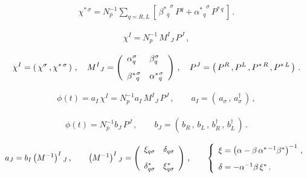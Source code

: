 \begin{eqnarray}
\chi^{*\,\sigma}=N_p^{-1}\sum_{q=R,L} \left[\,
{\beta^{*}{}_q}^{\!\!\!\sigma}\,P^q + {\alpha^{*}{}_q}^{\!\!\!\sigma}\,P^{*\,q}
\,\right]\,.
\end{eqnarray}

\begin{eqnarray}
\chi^I=N_p^{-1}\,M^I{}_J\,P^J\,,
\end{eqnarray}

\begin{eqnarray}
\chi^I=\left(\,\chi^\sigma\,,\chi^{*\,\sigma}\,\right)\,,\quad
M^I{}_J=\left(
\begin{array}{ll}
\alpha^\sigma_q & \beta^\sigma_q \vspace{3mm}\\
{\beta^{*}{}_q}^{\!\!\!\sigma} & {\alpha^{*}{}_q}^{\!\!\!\sigma} \\
\end{array}\right)\,,\quad
P^J=\left(\,P^R\,,P^L\,,P^{*\,R}\,, P^{*\,L}\,\right)\,.
\end{eqnarray}


\begin{eqnarray}
\phi(t)=a_I\,\chi^I=N_p^{-1}a_I\,M^I{}_J\,P^J\,,\qquad
a_I=\left(\,a_\sigma\,,\,a_\sigma^\dagger\,\right)\,,
\label{phi2}
\end{eqnarray}



\begin{eqnarray}
\phi(t)=N_p^{-1}b_J\,P^J\,,\qquad
b_J=\left(\,b_R\,,\,b_L\,,\,b_R^\dagger\,,\, b_L^\dagger\,\right)\,.
\label{phi3}
\end{eqnarray}


\begin{eqnarray}
a_J=b_I\left(M^{-1}\right)^I{}_J\,,\qquad
\left(M^{-1}\right)^I{}_J=\left(
\begin{array}{ll}
\xi_{q\sigma} & \delta_{q\sigma} \vspace{3mm}\\
\delta_{q\sigma}^* & \xi_{q\sigma}^* \\
\end{array}\right)\,,\qquad
\left\{
\begin{array}{l}
\xi=
\left(\alpha-\beta\,\alpha^{*\,-1}\beta^*\right)^{-1}\,,\vspace{3mm}\\
\delta=-\alpha^{-1}\beta\,\xi^*\,.
\end{array}
\right.
\label{xidelta1}
\end{eqnarray}


